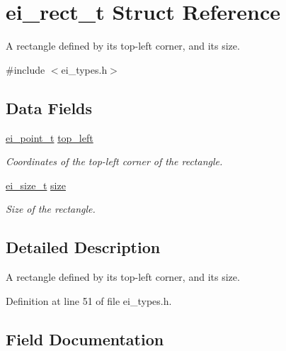 \hypertarget{structei__rect__t}{}\section{ei\+\_\+rect\+\_\+t Struct Reference}
\label{structei__rect__t}


A rectangle defined by its top-\/left corner, and its size.  




{\ttfamily \#include $<$ei\+\_\+types.\+h$>$}

\subsection*{Data Fields}
\begin{DoxyCompactItemize}
\item 
\hyperlink{structei__point__t}{ei\+\_\+point\+\_\+t} \hyperlink{structei__rect__t_aabe78780aa971b9cb9742ed59a2e9438}{top\+\_\+left}
\begin{DoxyCompactList}\small\item\em Coordinates of the top-\/left corner of the rectangle. \end{DoxyCompactList}\item 
\hyperlink{structei__size__t}{ei\+\_\+size\+\_\+t} \hyperlink{structei__rect__t_a200c48a352d448a24d4f85673f6bad14}{size}
\begin{DoxyCompactList}\small\item\em Size of the rectangle. \end{DoxyCompactList}\end{DoxyCompactItemize}


\subsection{Detailed Description}
A rectangle defined by its top-\/left corner, and its size. 

Definition at line 51 of file ei\+\_\+types.\+h.



\subsection{Field Documentation}
\mbox{\label{structei__rect__t_a200c48a352d448a24d4f85673f6bad14}} 
